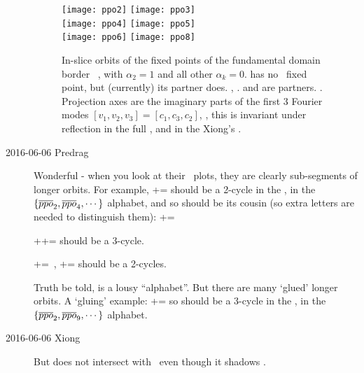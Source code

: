\begin{description}
\begin{figure}%
\begin{center}
    \texttt{[image: ppo2]}
    \texttt{[image: ppo3]} \\
    \texttt{[image: ppo4]}
    \texttt{[image: ppo5]} \\
    \texttt{[image: ppo6]}
    \texttt{[image: ppo8]}
\end{center}
   \caption{
In-slice orbits of the fixed points of the fundamental domain border
\PoincSec\ , with $\alpha_2 = 1$ and all other
$\alpha_k=0$.
          has no \PoincSec\ fixed point, but (currently) its
         partner  does.
         ,
         .
          and
          are partners.
         .
Projection axes are the imaginary parts of the first 3 Fourier modes
$[v_1, v_2, v_3] = [c_1, c_3, c_2]$, \ie, this is invariant under
reflection in the full \statesp, and in the Xiong's {\fFslice}
.
         }
  \label{fig:ppoFixedPts}
\end{figure}

\item[2016-06-06 Predrag]
Wonderful - when you look at their \statesp\ plots, they are clearly
sub-segments of longer orbits. For example,
\beq
{}+=
should be a 2-cycle in the \PoincSec, in the
$\{\overline{ppo}_{2},\overline{ppo}_{4},\cdots\}$ alphabet,
and so should be its cousin (so extra letters are needed to distinguish
them):
\beq
{}+=

\beq
{}++=
should be a 3-cycle.

\beq
{}+=
\,,\qquad
{}+=
should be a 2-cycles.

Truth be told,  is a lousy ``alphabet''. But
there are many `glued' longer orbits. A `gluing' example:
\beq
{}+=
so  should be a 3-cycle in the \PoincSec, in the
$\{\overline{ppo}_{2},\overline{ppo}_{9},\cdots\}$ alphabet.

\item[2016-06-06 Xiong]
But  does not intersect with \PoincSec\ even
though it shadows .


\end{description}
